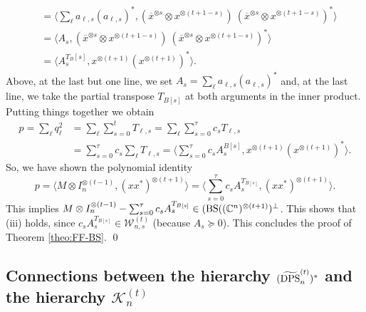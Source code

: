 \documentclass[11pt]{article}
\makeatletter
\newcommand{\C}{\ensuremath{\mathbb{C}}} %
\newcommand{\MW}{{\mathcal W}}
\newcommand{\MK}{{\mathcal K}}
\newcommand{\MKt}{\MK^{(t)}}
\newcommand{\DPS}{\text{\rm DPS}}
\newcommand{\tilDPSt}{\widetilde{\DPS}^{(t)}}
\newcommand{\ot}{\otimes}
\newcommand{\BS}{\text{\rm BS}}
\newcommand{\ovx}{\overline x}
\theoremstyle{plain}
\renewenvironment{proof}[1][\proofname]{%
  \par
  \pushQED{}%
  \normalfont
  \topsep6\p@\@plus6\p@
  \trivlist
  \item[\hskip\labelsep\itshape #1\@addpunct{.}]%
}{%
  \popQED
  \endtrivlist
}
\makeatother
\begin{document}
\begin{proof}[Proof of Theorem \ref{theo:FF-BS}]
\begin{align*}
&=\Big\langle \sum_\ell   a_{\ell,s} (a_{\ell,s})^*, (\ovx^{\ot s}\ot x^{\ot (t+1-s)}) \ (\ovx^{\ot s}\ot x^{\ot (t+1-s)})^* \Big\rangle
\\
&=\langle A_s, (\ovx^{\ot s}\ot x^{\ot (t+1-s)}) \ (\ovx^{\ot s}\ot x^{\ot (t+1-s)})^* \rangle\\
&
= \langle A_s^{T_B[s]}, x^{\ot (t+1)} (x^{\ot (t+1)})^*\rangle.
\end{align*}
Above, at the last but one line, we set $A_s=\sum_\ell a_{\ell,s}(a_{\ell,s})^*$ and, at the last line, we take the partial transpose $T_{B[s]}$ at both arguments in the inner product. 
Putting things together we obtain
\begin{align*}
p= \sum_\ell q_\ell^2 & =\sum_\ell  \sum_{s=0}^t    T_{\ell,s} 
= \sum_\ell \sum_{s=0}^\tau c_s T_{\ell,s}\\
&=\sum_{s=0}^\tau c_s\sum_\ell T_{\ell,s}
=\Big \langle \sum_{s=0}^\tau c_s A_s^{B[s]}, x^{\ot (t+1)} (x^{\ot (t+1)})^*\Big\rangle.
\end{align*}
So, we have shown  the polynomial identity
$$p=\langle M\ot I_n^{\ot (t-1)}, (xx^*)^{\ot (t+1)}\rangle =  \big\langle  \sum_{s=0}^\tau c_sA_s^{T_{B[s]}}, (xx^*)^{\ot (t+1)}\big\rangle.$$
This implies   $M\ot I_n^{\ot (t-1)} - \sum_{s=0}^\tau c_s A_s^{T_{B[s]}} \in (\BS((\C^n)^{\ot (t+1)})^\perp$.
This shows that (iii) holds, since $c_sA_s^{T_{B[s]}}\in \MW^{(t)}_{n,s}$ (because $A_s\succeq 0$). This concludes the proof of Theorem \ref{theo:FF-BS}.
\qed \end{proof}

\subsection[\smash{Connections between the hierarchy $(\tilDPSt_n)^*$ and the hierarchy $\MKt_n$}]{Connections between the hierarchy $(\tilDPSt_n)^*$ and the hierarchy $\MKt_n$}
\end{document}
